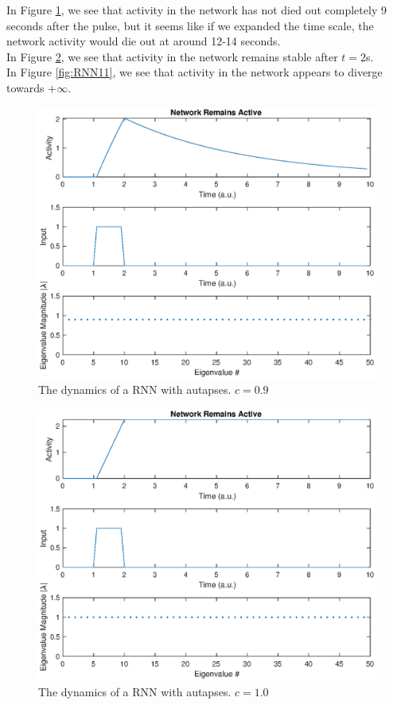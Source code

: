 \documentclass[11pt, oneside]{article}
\begin{document}
In Figure \ref{fig:RNN09}, we see that activity in the network has not died out completely 9 seconds after the pulse, but it seems like if we expanded the time scale, the network activity would die out at around 12-14 seconds. \\
In Figure \ref{fig:RNN10}, we see that activity in the network remains stable after $t = 2$s.\\
In Figure \ref{fig:RNN11}, we see that activity in the network appears to diverge towards $+\infty$.\\

\begin{figure}[ht!]
\includegraphics[width=1\textwidth]{RNN09.eps}
\caption{The dynamics of a RNN with autapses. $c = 0.9$}
\label{fig:RNN09}
\end{figure}

\begin{figure}[ht!]
\includegraphics[width=1\textwidth]{RNN10.eps}
\caption{The dynamics of a RNN with autapses. $c = 1.0$}
\label{fig:RNN10}
\end{figure}
\end{document}
